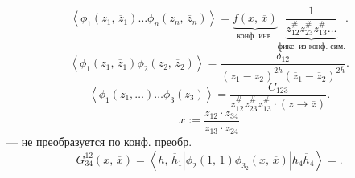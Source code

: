 \documentclass[a4paper]{article}
\title{}
\begin{document}
	\maketitle
\[
	\left< \phi_1 \left( z_1,\,\overline{z}_1 \right) \ldots\phi_n \left( z_n,\,\overline{z}_n \right)  \right> 
	=
	\underbrace{f\left( x,\,\overline{x} \right) }_{\text{конф. инв.}}
	\underbrace{\frac{1}{z_{12}^{\#}z_{23}^{\#}z_{13}^{\#}\ldots}
}_{\text{фикс. из конф. сим.}}.\] 
\[
	\left<\phi_1 \left( z_1 ,\,\overline{z}_1 \right) 
	\phi _2 \left( z_2,\,\overline{z}_2 \right) \right> 
	=\frac{\delta_{12}}{(z_1-z_2)^{2h} \left( \overline{z}_1 - \overline{z}_2 \right) ^{2 \overline{h}}}
.\] 
\[
	\left<\phi_1 \left( z_1,\ldots \right) \ldots
	\phi_3 \left( z_3 \right) \right> 
	=\frac{C_{123}}{z_{12}^{\#} z_{23}^{\#}z_{13}^{\#}
	\cdot \left( z \to \overline{z} \right) }
.\] 
\[
x := \frac{z_{12}\cdot z_{34}}{z_{13}\cdot  z_{24}}
\]
--- не преобразуется по конф. преобр.
\[
	G^{12}_{34} \left( x,\,\overline{x} \right) 
	= \left< h,\,\overline{h}_1| \phi_2 (1,\,1)\phi_3
	_2 \left( x,\,\overline{x} \right) | h_4 \overline{h}_4\right> =
.\] 
\end{document}
